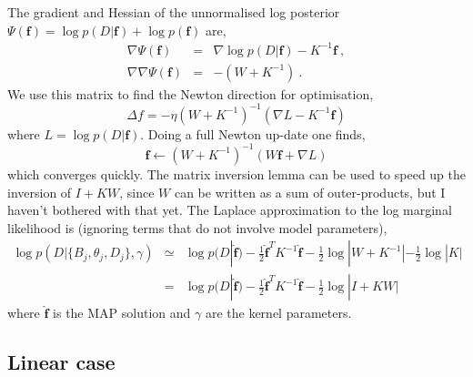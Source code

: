 \documentclass[10pt]{article}
\begin{document}
The gradient and Hessian of the unnormalised log posterior $\Psi(\bm f) = \log p(D|\bm f) + \log p(\bm f)$ are,
\begin{eqnarray}
\nabla \Psi(\bm f) & = & \nabla \log p(D|\bm f) -K^{-1}{\bm f}
\label{eqn_MAP} \ , \\
\nabla\nabla \Psi(\bm f) & = & - (W + K^{-1}) \ .
\end{eqnarray}
We use this matrix to find the Newton direction for optimisation,
\begin{equation}
	\Delta f = -\eta (W+K^{-1})^{-1} (\nabla L - K^{-1}\bm f)
\end{equation}
where $L=\log p(D|\bm f)$. 
Doing a full Newton up-date one finds,
\begin{equation}
  {\bm f} \leftarrow (W+K^{-1})^{-1}(W\bm{f} + \nabla L)
\end{equation}
which converges quickly. The matrix inversion lemma can be used to
speed up the inversion of $I+KW$, since $W$ can be written as a sum of
outer-products, but I haven't bothered with that yet. The Laplace approximation to the log
marginal likelihood is (ignoring terms that do not involve model parameters),
\begin{eqnarray}
\log p(D|\{B_j,\theta_j,D_j\},\gamma) & \simeq & \log p(D|\hat{\bm f}) -
\mbox{$\frac{1}{2}$}\hat{\bm f}^T K^{-1} \hat{\bm f} - \mbox{$\frac{1}{2}$}\log|W+K^{-1}| 
- \mbox{$\frac{1}{2}$}\log|K| \nonumber \\
& = & \log p(D|\hat{\bm f}) - \mbox{$\frac{1}{2}$}\hat{\bm f}^T K^{-1}
\hat{\bm f} - \mbox{$\frac{1}{2}$}\log|I+KW| 
\label{eqn_marginal}
\end{eqnarray}
where $\hat{\bm f}$ is the MAP solution and $\gamma$ are the kernel parameters.

\subsection{Linear case}
\end{document}
